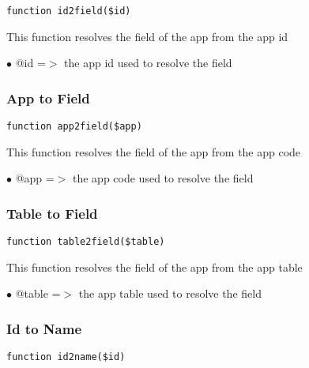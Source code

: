 \documentclass[a4paper]{article}
\begin{document}
\begin{lstlisting}
function id2field($id)
\end{lstlisting}

This function resolves the field of the app from the app id

\begin{compactitem}
\item[\color{myblue}$\bullet$] @id =$>$ the app id used to resolve the field
\end{compactitem}

\hypertarget{toc40}{}
\subsubsection{App to Field}

\begin{lstlisting}
function app2field($app)
\end{lstlisting}

This function resolves the field of the app from the app code

\begin{compactitem}
\item[\color{myblue}$\bullet$] @app =$>$ the app code used to resolve the field
\end{compactitem}

\hypertarget{toc41}{}
\subsubsection{Table to Field}

\begin{lstlisting}
function table2field($table)
\end{lstlisting}

This function resolves the field of the app from the app table

\begin{compactitem}
\item[\color{myblue}$\bullet$] @table =$>$ the app table used to resolve the field
\end{compactitem}

\hypertarget{toc42}{}
\subsubsection{Id to Name}

\begin{lstlisting}
function id2name($id)
\end{lstlisting}
\end{document}
